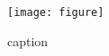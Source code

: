 \begin{figure}[ht]
\centering
	\texttt{[image: figure]}
	\caption{caption}
 \label{fig:lbl}
\end{figure}
 
